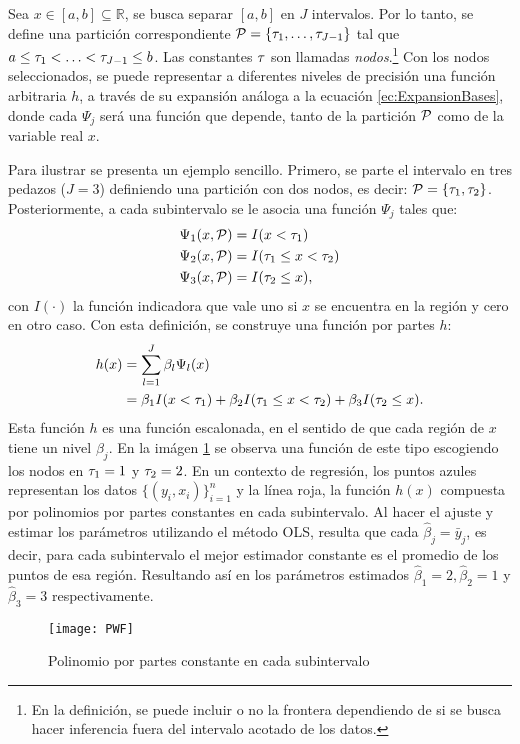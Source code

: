 \documentclass[../Main/Main.tex]{subfiles}
\begin{document}
Sea $x\in[a,b]\subseteq\mathbb{R}$, se busca separar $[a,b]$ en $J$ intervalos. Por lo tanto, se define una partición correspondiente $\P = \left\{\t_1, \ldots,  \t_{J-1} \right\}$ tal que $a \leq  \t_1 < \ldots <  \t_{J-1} \leq b$. Las constantes $\t$ son llamadas \textit{nodos}.\footnote{En la definición, se puede incluir o no la frontera dependiendo de si se busca hacer inferencia fuera del intervalo acotado de los datos.} Con los nodos seleccionados, se puede representar a diferentes niveles de precisión una función arbitraria $h$, a través de su expansión análoga a la ecuación \eqref{ec:ExpansionBases}, donde cada $\Psi_j$ será una función que depende, tanto de la partición $\P$ como de la variable real $x$. 

Para ilustrar se presenta un ejemplo sencillo. Primero, se parte el intervalo en tres pedazos ($J = 3$) definiendo una partición con dos nodos, es decir: $\P = \left\{\t_1,  \t_2\right\}$. Posteriormente, a cada subintervalo se le asocia una función $\Psi_j$ tales que:
\begin{align*}
	\Psi_1(x,\P) &= I( x <  \t_1) \\
	\Psi_2(x,\P) &= I( \t_1 \leq x <  \t_2) \\
	\Psi_3(x,\P) &= I( \t_2 \leq x ),
\end{align*}
con $I(\cdot)$ la función indicadora que vale uno si $x$ se encuentra en la región y cero en otro caso. Con esta definición, se construye una función por partes $h$: 
\begin{align*}
		h(x) &= \sum_{l = 1}^J \beta_l\Psi_l(x) \\
			 &= \beta_1 I( x <  \t_1) + \beta_2 I( \t_1 \leq x <  \t_2) + \beta_3 I( \t_2 \leq x).
\end{align*}
Esta función $h$ es una función escalonada, en el sentido de que cada región de $x$ tiene un nivel $\beta_j$. En la imágen \ref{fig:PWF} se observa una función de este tipo escogiendo los nodos en $\t_1 = 1$ y $\t_2 = 2$. En un contexto de regresión, los puntos azules representan los datos $\{(y_i,x_i)\}_{i = 1}^n$ y la línea roja, la función $h(x)$ compuesta por polinomios por partes constantes en cada subintervalo. Al hacer el ajuste y estimar los parámetros utilizando el método OLS, resulta que cada $\hat{\beta}_j = \bar{y}_j$, es decir, para cada subintervalo el mejor estimador constante es el promedio de los puntos de esa región. Resultando así en los parámetros estimados $\hat{\beta}_1 = 2, \hat{\beta}_2 = 1$ y $\hat{\beta}_3 = 3$ respectivamente.

\begin{figure}[h]
  \centering
      \texttt{[image: PWF]}
  \caption{Polinomio por partes constante en cada subintervalo}
  \label{fig:PWF}
\end{figure}
\end{document}
